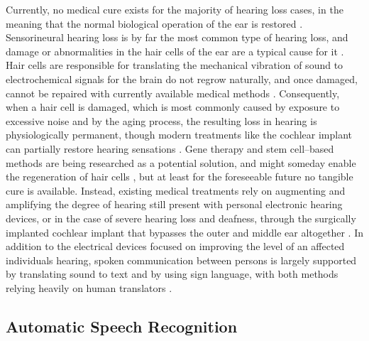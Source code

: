 \documentclass[english, 12pt, a4paper, pdftex, elec, utf8]{aaltothesis}
\begin{document}
Currently, no medical cure exists for the majority of hearing loss cases, in the meaning that the normal biological operation of the ear is restored \cite{moore2007cochlear}. Sensorineural hearing loss is by far the most common type of hearing loss, and damage or abnormalities in the hair cells of the ear are a typical cause for it \cite{moore2007cochlear, koskela2013kuulokojeen}. Hair cells are responsible for translating the mechanical vibration of sound to electrochemical signals for the brain do not regrow naturally, and once damaged, cannot be repaired with currently available medical methods  \cite{moore2007cochlear}. Consequently, when a hair cell is damaged, which is most commonly caused by exposure to excessive noise and by the aging process, the resulting loss in hearing is physiologically permanent, though modern treatments like the cochlear implant can partially restore hearing sensations \cite{moore2007cochlear}. Gene therapy and stem cell--based methods are being researched as a potential solution, and might someday enable the regeneration of hair cells  \cite{mclean2017clonal}, but at least for the foreseeable future no tangible cure is available. Instead, existing medical treatments rely on augmenting and amplifying the degree of hearing still present with personal electronic hearing devices, or in the case of severe hearing loss and deafness, through the surgically implanted cochlear implant that bypasses the outer and middle ear altogether \cite{moore2007cochlear}. In addition to the electrical devices focused on improving the level of an affected individuals hearing, spoken communication between persons is largely supported by translating sound to text and by using sign language, with both methods relying heavily on human translators \cite{moore2007cochlear, raino2012sisakorvaistutteen}.

\subsection{Automatic Speech Recognition}
\end{document}
